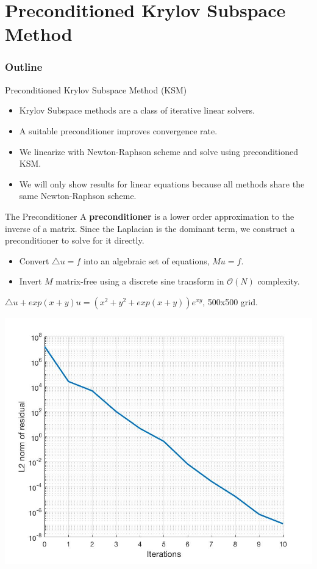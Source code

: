 \documentclass{beamer}
\begin{document}
\section{Preconditioned Krylov Subspace Method}
\begin{frame}
\frametitle{Outline}
  \tableofcontents[currentsection]
\end{frame}

\begin{frame}{Preconditioned Krylov Subspace Method (KSM)}
\begin{itemize}
    \item Krylov Subspace methods are a class of iterative linear solvers.
    \item A suitable preconditioner improves convergence rate.
    \item We linearize with Newton-Raphson scheme and solve using preconditioned KSM.
    \item We will only show results for linear equations because all methods share the same Newton-Raphson scheme.
\end{itemize}
\end{frame}

\begin{frame}{The Preconditioner}
A \textbf{preconditioner} is a lower order approximation to the inverse of a matrix. Since the Laplacian is the dominant term, we construct a preconditioner to solve for it directly. \\
\begin{itemize}
    \item Convert $\triangle u=f$ into an algebraic set of equations, $Mu=f$.
    \item Invert $M$ matrix-free using a discrete sine transform in $\mathcal{O}(N)$ complexity.
\end{itemize}
\end{frame}

\begin{frame}
 $\triangle u+exp(x+y)u=(x^2+y^2+exp(x+y))e^{xy}$, 500x500 grid.
 \begin{center}
     \includegraphics[scale=0.25]{res.jpg}
 \end{center}

\end{frame}
\end{document}
